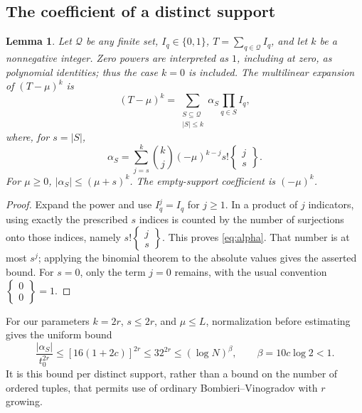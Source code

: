 \documentclass[11pt]{article}
\newtheorem{lemma}[theorem]{Lemma}
\theoremstyle{remark}\newtheorem{remark}[theorem]{Remark}
\begin{document}
\subsection{The coefficient of a distinct support}
\begin{lemma}\label{lem:compression}
Let $\mathcal Q$ be any finite set, $I_q\in\{0,1\}$,
$T=\sum_{q\in\mathcal Q}I_q$, and let $k$ be a nonnegative integer.
Zero powers are interpreted as $1$, including at zero, as polynomial
identities; thus the case $k=0$ is included.
The multilinear expansion of $(T-\mu)^k$ is
\begin{equation}\label{eq:multilinear}
 (T-\mu)^k=\sum_{\substack{S\subseteq\mathcal Q\\|S|\le k}}
                  \alpha_S\prod_{q\in S}I_q,
\end{equation}
where, for $s=|S|$,
\begin{equation}\label{eq:alpha}
 \alpha_S=\sum_{j=s}^k\binom{k}{j}(-\mu)^{k-j}s!
                      \left\{\begin{matrix}j\\s\end{matrix}\right\}.
\end{equation}
For $\mu\ge0$, $|\alpha_S|\le(\mu+s)^k$. The empty-support
coefficient is $(-\mu)^k$.
\end{lemma}
\begin{proof}
Expand the power and use $I_q^j=I_q$ for $j\ge1$. In a product of
$j$ indicators, using exactly the prescribed $s$ indices is counted by
the number of surjections onto those indices, namely
$s!\left\{\begin{smallmatrix}j\\s\end{smallmatrix}\right\}$.
This proves \eqref{eq:alpha}. That number is at most $s^j$; applying the
binomial theorem to the absolute values gives the asserted bound.
For $s=0$, only the term $j=0$ remains, with the usual convention
$\left\{\begin{smallmatrix}0\\0\end{smallmatrix}\right\}=1$.
\end{proof}
For our parameters $k=2r$, $s\le2r$, and $\mu\le L$, normalization
before estimating gives the uniform bound
\begin{equation}\label{eq:coefficient-budget}
 \frac{|\alpha_S|}{t_0^{2r}}
 \le[16(1+2c)]^{2r}\le32^{2r}
 \le(\log N)^{\beta},\qquad \beta=10c\log2<1.
\end{equation}
It is this bound per distinct support, rather than a bound on the
number of ordered tuples, that permits use of ordinary
Bombieri--Vinogradov with $r$ growing.
\end{document}
